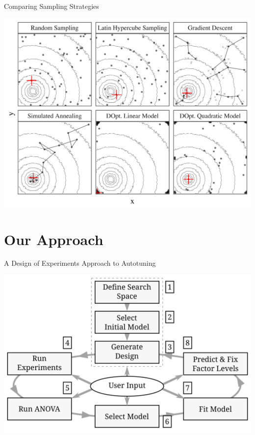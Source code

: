 \documentclass[10pt, compress, aspectratio=169, xcolor={table,usenames,dvipsnames}]{beamer}
\begin{document}
\begin{frame}[label={sec:org5122e5b}]{Comparing Sampling Strategies}
\begin{center}
\begin{center}
\includegraphics[width=.72\textwidth]{../../../img/sampling_comparison.pdf}
\end{center}
\end{center}
\end{frame}
\section{Our Approach}
\label{sec:orgccf7891}
\begin{frame}[label={sec:orgb534b8e}]{A Design of Experiments Approach to Autotuning}
\begin{center}
\begin{center}
\includegraphics[width=.74\linewidth]{../../../img/doe_anova_strategy.pdf}
\end{center}

\vspace{-.2cm}
\end{center}
\end{frame}
\end{document}
